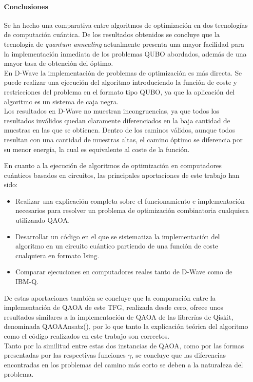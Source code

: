 \paragraph{Conclusiones}
Se ha hecho una comparativa entre algoritmos de optimización en dos tecnologías de computación cuántica.
De los resultados obtenidos se concluye que la tecnología de \textit{quantum annealing} actualmente presenta una mayor facilidad para la implementación inmediata de los problemas QUBO abordados, además de una mayor tasa de obtención del óptimo.
\\
En D-Wave la implementación de problemas de optimización es más directa.
Se puede realizar una ejecución del algoritmo introduciendo la función de coste y restricciones del problema en el formato tipo QUBO, ya que la aplicación del algoritmo es un sistema de caja negra.
\\
Los resultados en D-Wave no muestran incongruencias, ya que todos los resultados inválidos quedan claramente diferenciados en la baja cantidad de muestras en las que se obtienen.
Dentro de los caminos válidos, aunque todos resultan con una cantidad de muestras altas, el camino óptimo se diferencia por su menor energía, la cual es equivalente al coste de la función.

En cuanto a la ejecución de algoritmos de optimización en computadores cuánticos basados en circuitos, las principales aportaciones de este trabajo han sido:

\begin{itemize}
\item Realizar una explicación completa sobre el funcionamiento e implementación necesarios para resolver un problema de optimización combinatoria cualquiera utilizando QAOA\@.
  
\item Desarrollar un código en el que se sistematiza la implementación del algoritmo en un circuito cuántico partiendo de una función de coste cualquiera en formato Ising.

\item Comparar ejecuciones en computadores reales tanto de D-Wave como de IBM-Q.
\end{itemize}

De estas aportaciones también se concluye que la comparación entre la implementación de QAOA de este TFG, realizada desde cero, ofrece unos resultados similares a la implementación de QAOA de las librerías de Qiskit, denominada QAOAAnsatz(), por lo que tanto la explicación teórica del algoritmo como el código realizados en este trabajo son correctos.
\\
Tanto por la similitud entre estas dos instancias de QAOA, como por las formas presentadas por las respectivas funciones $\gamma$, se concluye que las diferencias encontradas en los problemas del camino más corto se deben a la naturaleza del problema.

